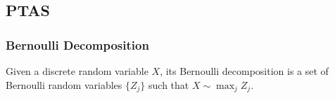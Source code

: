 \documentclass{beamer}
\begin{document}
\subsection{PTAS}
\begin{frame}
    \frametitle{Bernoulli Decomposition}
    \begin{definition}
        Given a discrete random variable $X$, its Bernoulli decomposition is a set of Bernoulli random variables $\{Z_j\}$ such that $X\sim \max_j Z_j$.
    \end{definition}
    \begin{spacing}{3.0}

    \end{spacing}
\end{frame}
\end{document}
